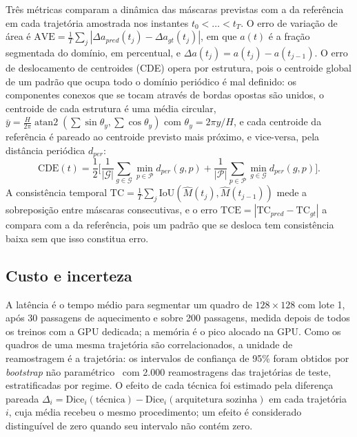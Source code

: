 \documentclass[final,5p,times,twocolumn]{elsarticle}
\begin{document}
Três métricas comparam a dinâmica das máscaras previstas com a da referência em cada trajetória amostrada nos instantes $t_0<\dots<t_T$. O erro de variação de área é $\mathrm{AVE}=\frac{1}{T}\sum_j|\Delta a_{pred}(t_j)-\Delta a_{gt}(t_j)|$, em que $a(t)$ é a fração segmentada do domínio, em percentual, e $\Delta a(t_j)=a(t_j)-a(t_{j-1})$. O erro de deslocamento de centroides (CDE) opera por estrutura, pois o centroide global de um padrão que ocupa todo o domínio periódico é mal definido: os componentes conexos que se tocam através de bordas opostas são unidos, o centroide de cada estrutura é uma média circular, $\bar y=\frac{H}{2\pi}\operatorname{atan2}(\sum\sin\theta_y,\sum\cos\theta_y)$ com $\theta_y=2\pi y/H$, e cada centroide da referência é pareado ao centroide previsto mais próximo, e vice-versa, pela distância periódica $d_{per}$:
\begin{equation}\label{eq:cde}
\mathrm{CDE}(t)=\frac12\Big[\frac{1}{|\mathcal{G}|}\sum_{g\in\mathcal{G}}\min_{p\in\mathcal{P}}d_{per}(g,p)+\frac{1}{|\mathcal{P}|}\sum_{p\in\mathcal{P}}\min_{g\in\mathcal{G}}d_{per}(g,p)\Big].
\end{equation}
A consistência temporal $\mathrm{TC}=\frac{1}{T}\sum_j\mathrm{IoU}(\hat M(t_j),\hat M(t_{j-1}))$ mede a sobreposição entre máscaras consecutivas, e o erro $\mathrm{TCE}=|\mathrm{TC}_{pred}-\mathrm{TC}_{gt}|$ a compara com a da referência, pois um padrão que se desloca tem consistência baixa sem que isso constitua erro.

\subsection{Custo e incerteza}\label{subsec:cost}

A latência é o tempo médio para segmentar um quadro de $128\times128$ com lote 1, após 30 passagens de aquecimento e sobre 200 passagens, medida depois de todos os treinos com a GPU dedicada; a memória é o pico alocado na GPU. Como os quadros de uma mesma trajetória são correlacionados, a unidade de reamostragem é a trajetória: os intervalos de confiança de 95\% foram obtidos por \textit{bootstrap} não paramétrico~\cite{efron1993} com 2.000 reamostragens das trajetórias de teste, estratificadas por regime. O efeito de cada técnica foi estimado pela diferença pareada $\Delta_i=\mathrm{Dice}_i(\text{técnica})-\mathrm{Dice}_i(\text{arquitetura sozinha})$ em cada trajetória $i$, cuja média recebeu o mesmo procedimento; um efeito é considerado distinguível de zero quando seu intervalo não contém zero.
\end{document}
